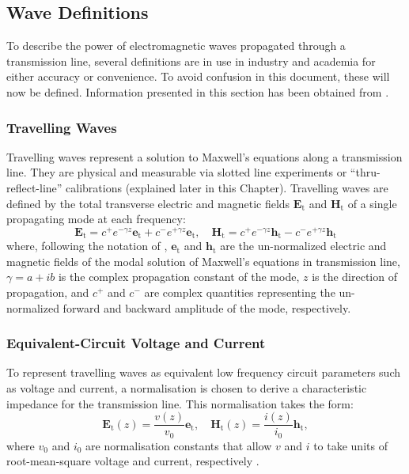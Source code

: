 \documentclass[../thesis/thesis.tex]{subfiles}
\begin{document}
\subsection{Wave Definitions}

To describe the power of electromagnetic waves propagated through a transmission line, several definitions are in use in industry and academia for either accuracy or convenience. To avoid confusion in this document, these will now be defined. Information presented in this section has been obtained from \cite{Williams_2013,Marcuvitz_1951,Marks_1992,Kurokawa_1965,Williams_2001}.

\subsubsection{Travelling Waves}

Travelling waves represent a solution to Maxwell's equations along a transmission line. They are physical and measurable via slotted line experiments or ``thru-reflect-line'' calibrations (explained later in this Chapter). Travelling waves are defined by the total transverse electric and magnetic fields $\bm{E}_\textrm{t}$ and $\bm{H}_\textrm{t}$ of a single propagating mode at each frequency:
\begin{equation}
\bm{E}_\textrm{t}=c^+e^{-\gamma z}\bm{e}_\textrm{t}+c^-e^{+\gamma z}\bm{e}_\textrm{t},\quad
\bm{H}_\textrm{t}=c^+e^{-\gamma z}\bm{h}_\textrm{t}-c^-e^{+\gamma z}\bm{h}_\textrm{t}
\end{equation}
where, following the notation of \cite{Williams_2001}, $\bm{e}_\textrm{t}$ and $\bm{h}_\textrm{t}$ are the un-normalized electric and magnetic fields of the modal solution of Maxwell’s equations in transmission line, $\gamma=a+ib$ is the complex propagation constant of the mode, $z$ is the direction of propagation, and $c^+$ and $c^-$ are complex quantities representing the un-normalized forward and backward amplitude of the mode, respectively.

\subsubsection{Equivalent-Circuit Voltage and Current}

To represent travelling waves as equivalent low frequency circuit parameters such as voltage and current, a normalisation is chosen to derive a characteristic impedance for the transmission line. This normalisation takes the form:
\begin{equation}
\bm{E}_\textrm{t}(z)=\dfrac{v(z)}{v_0}\bm{e}_\textrm{t},\quad
\bm{H}_\textrm{t}(z)=\dfrac{i(z)}{i_0}\bm{h}_\textrm{t},
\end{equation}
where $v_0$ and $i_0$ are normalisation constants that allow $v$ and $i$ to take units of root-mean-square voltage and current, respectively \cite{Williams_2001}.
\end{document}
